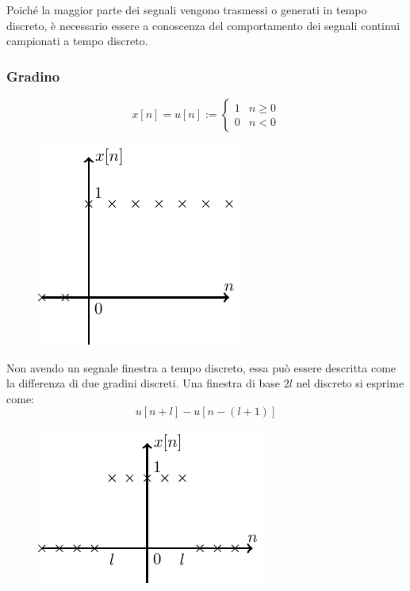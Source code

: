 \documentclass{article}
\numberwithin{equation}{subsection}
\begin{document}
Poiché la maggior parte dei segnali vengono trasmessi o generati in tempo discreto, è necessario essere a conoscenza del comportamento dei segnali continui campionati a 
tempo discreto. 

\subsubsection{Gradino}

\begin{equation}
    x[n]=u[n]:=\begin{cases}
        1&n\geq0\\
        0&n<0
    \end{cases}
\end{equation}

\begin{figure}[H]%
    \centering
    \includegraphics{gradino-discreto.pdf}%
\end{figure}

Non avendo un segnale finestra a tempo discreto, essa può essere descritta come la differenza di due gradini discreti. Una finestra di base $2l$ nel discreto si esprime come:
\begin{equation*}
    u[n+l]-u[n-(l+1)]
\end{equation*}

\begin{figure}[H]%
    \centering
    \includegraphics{finestra-discreto.pdf}%
\end{figure}
\end{document}
